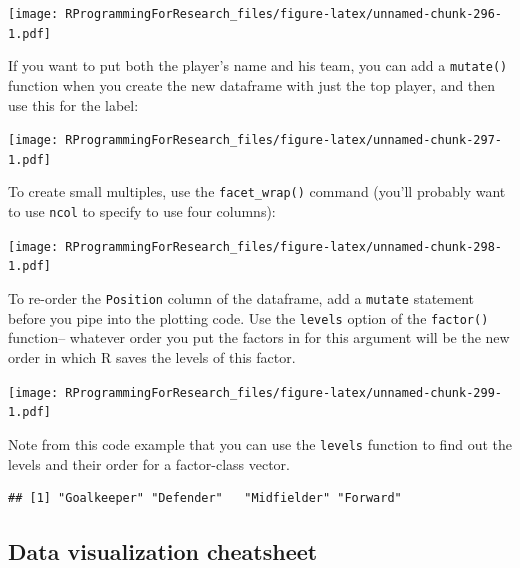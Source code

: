 \documentclass[]{book}
\makeatletter
\newenvironment{Shaded}{\begin{snugshade}}{\end{snugshade}}
\newcommand{\KeywordTok}[1]{\textcolor[rgb]{0.13,0.29,0.53}{\textbf{#1}}}
\newcommand{\DataTypeTok}[1]{\textcolor[rgb]{0.13,0.29,0.53}{#1}}
\newcommand{\StringTok}[1]{\textcolor[rgb]{0.31,0.60,0.02}{#1}}
\newcommand{\OperatorTok}[1]{\textcolor[rgb]{0.81,0.36,0.00}{\textbf{#1}}}
\newcommand{\NormalTok}[1]{#1}
\newenvironment{kframe}{%
\medskip{}
\setlength{\fboxsep}{.8em}
 \def\at@end@of@kframe{}%
 \ifinner\ifhmode%
  \def\at@end@of@kframe{\end{minipage}}%
  \begin{minipage}{\columnwidth}%
 \fi\fi%
 \def\FrameCommand##1{\hskip\@totalleftmargin \hskip-\fboxsep
 \colorbox{shadecolor}{##1}\hskip-\fboxsep
     \hskip-\linewidth \hskip-\@totalleftmargin \hskip\columnwidth}%
 \MakeFramed {\advance\hsize-\width
   \@totalleftmargin\z@ \linewidth\hsize
   \@setminipage}}%
 {\par\unskip\endMakeFramed%
 \at@end@of@kframe}
\renewenvironment{Shaded}{\begin{kframe}}{\end{kframe}}
\newenvironment{rmdblock}[1]
  {
  \begin{itemize}
  \renewcommand{\labelitemi}{
    \raisebox{-.7\height}[0pt][0pt]{
      {\setkeys{Gin}{width=3em,keepaspectratio}\texttt{[image: images/\#1]}}
    }
  }
  \setlength{\fboxsep}{1em}
  \begin{kframe}
  \item
  }
  {
  \end{kframe}
  \end{itemize}
  }
\newenvironment{rmdnote}
  {\begin{rmdblock}{note}}
  {\end{rmdblock}}
\theoremstyle{definition}
\theoremstyle{definition}
\theoremstyle{definition}
\theoremstyle{remark}
\makeatother
\begin{document}
\texttt{[image: RProgrammingForResearch\_files/figure-latex/unnamed-chunk-296-1.pdf]}

If you want to put both the player's name and his team, you can add a
\texttt{mutate()} function when you create the new dataframe with just
the top player, and then use this for the label:

\texttt{[image: RProgrammingForResearch\_files/figure-latex/unnamed-chunk-297-1.pdf]}

To create small multiples, use the \texttt{facet\_wrap()} command
(you'll probably want to use \texttt{ncol} to specify to use four
columns):

\texttt{[image: RProgrammingForResearch\_files/figure-latex/unnamed-chunk-298-1.pdf]}

To re-order the \texttt{Position} column of the dataframe, add a
\texttt{mutate} statement before you pipe into the plotting code. Use
the \texttt{levels} option of the \texttt{factor()} function-- whatever
order you put the factors in for this argument will be the new order in
which R saves the levels of this factor.

\texttt{[image: RProgrammingForResearch\_files/figure-latex/unnamed-chunk-299-1.pdf]}

\begin{rmdnote}
Note from this code example that you can use the \texttt{levels}
function to find out the levels and their order for a factor-class
vector.
\end{rmdnote}

\begin{Shaded}
\end{Shaded}

\begin{verbatim}
## [1] "Goalkeeper" "Defender"   "Midfielder" "Forward"
\end{verbatim}

\subsection{Data visualization
cheatsheet}\label{data-visualization-cheatsheet}
\end{document}
